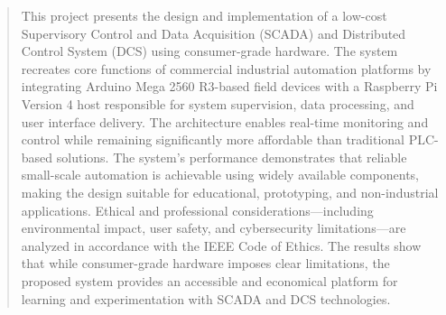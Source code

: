 \begin{abstract}
This project presents the design and implementation of a low-cost Supervisory Control and Data Acquisition (SCADA) and Distributed Control System (DCS) using consumer-grade hardware. The system recreates core functions of commercial industrial automation platforms by integrating Arduino Mega 2560 R3-based field devices with a Raspberry Pi Version 4 host responsible for system supervision, data processing, and user interface delivery. The architecture enables real-time monitoring and control while remaining significantly more affordable than traditional PLC-based solutions. The system’s performance demonstrates that reliable small-scale automation is achievable using widely available components, making the design suitable for educational, prototyping, and non-industrial applications. Ethical and professional considerations—including environmental impact, user safety, and cybersecurity limitations—are analyzed in accordance with the IEEE Code of Ethics. The results show that while consumer-grade hardware imposes clear limitations, the proposed system provides an accessible and economical platform for learning and experimentation with SCADA and DCS technologies.
\end{abstract}